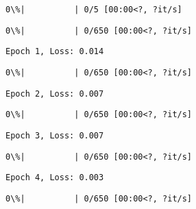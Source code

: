 \documentclass[11pt]{article}
\begin{document}
    
    \begin{Verbatim}[commandchars=\\\{\}]
  0\%|          | 0/5 [00:00<?, ?it/s]
    \end{Verbatim}

    
    
    \begin{Verbatim}[commandchars=\\\{\}]
  0\%|          | 0/650 [00:00<?, ?it/s]
    \end{Verbatim}

    
    \begin{Verbatim}[commandchars=\\\{\}]
Epoch 1, Loss: 0.014
    \end{Verbatim}

    
    \begin{Verbatim}[commandchars=\\\{\}]
  0\%|          | 0/650 [00:00<?, ?it/s]
    \end{Verbatim}

    
    \begin{Verbatim}[commandchars=\\\{\}]
Epoch 2, Loss: 0.007
    \end{Verbatim}

    
    \begin{Verbatim}[commandchars=\\\{\}]
  0\%|          | 0/650 [00:00<?, ?it/s]
    \end{Verbatim}

    
    \begin{Verbatim}[commandchars=\\\{\}]
Epoch 3, Loss: 0.007
    \end{Verbatim}

    
    \begin{Verbatim}[commandchars=\\\{\}]
  0\%|          | 0/650 [00:00<?, ?it/s]
    \end{Verbatim}

    
    \begin{Verbatim}[commandchars=\\\{\}]
Epoch 4, Loss: 0.003
    \end{Verbatim}

    
    \begin{Verbatim}[commandchars=\\\{\}]
  0\%|          | 0/650 [00:00<?, ?it/s]
    \end{Verbatim}
\end{document}

